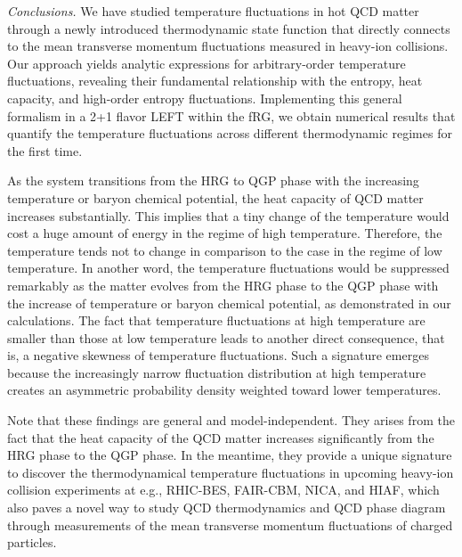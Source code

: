 \documentclass[aps,twocolumn,prd,superscriptaddress,nofootinbib,floatfix]{revtex4-2}
\begin{document}
\textit{Conclusions.}\label{sec:conclusion} We have studied temperature fluctuations in hot QCD matter through a newly introduced thermodynamic state function that directly connects to the mean transverse momentum fluctuations measured in heavy-ion collisions. Our approach yields analytic expressions for arbitrary-order temperature fluctuations, revealing their fundamental relationship with the entropy, heat capacity, and high-order entropy fluctuations. Implementing this general formalism in a 2+1 flavor LEFT within the fRG, we obtain numerical results that quantify the temperature fluctuations across different thermodynamic regimes for the first time.

As the system transitions from the HRG to QGP phase with the increasing temperature or baryon chemical potential, the heat capacity of QCD matter increases substantially. This implies that a tiny change of the temperature would cost a huge amount of energy in the regime of high temperature. Therefore, the temperature tends not to change in comparison to the case in the regime of low temperature. In another word, the temperature fluctuations would be suppressed remarkably as the matter evolves from the HRG phase to the QGP phase with the increase of temperature or baryon chemical potential, as demonstrated in our calculations. The fact that temperature fluctuations at high temperature are smaller than those at low temperature leads to another direct consequence, that is, a negative skewness of temperature fluctuations. Such a signature emerges because the increasingly narrow fluctuation distribution at high temperature creates an asymmetric probability density weighted toward lower temperatures. 

Note that these findings are general and model-independent. They arises from the fact that the heat capacity of the QCD matter increases significantly from the HRG phase to the QGP phase. In the meantime, they provide a unique signature to discover the thermodynamical temperature fluctuations in upcoming heavy-ion collision experiments at e.g., RHIC-BES, FAIR-CBM, NICA, and HIAF, which also paves a novel way to study QCD thermodynamics and QCD phase diagram through measurements of the mean transverse momentum fluctuations of charged particles.
\end{document}

